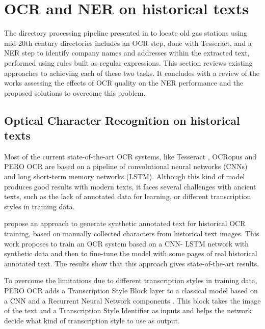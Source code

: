 \section{OCR and NER on historical texts}

The directory processing pipeline presented in \cite{bell2020automated} to locate old gas stations using mid-20th century directories includes an OCR step, done with Tesseract, and a NER step to identify company names and addresses within the extracted text, performed using rules built as regular expressions. This section reviews existing approaches to achieving each of these two tasks. It concludes with a review of the works assessing the effects of OCR quality on the NER performance and the proposed solutions to overcome this problem. 

\subsection{Optical Character Recognition on historical texts}

Most of the current state-of-the-art OCR systems, like Tesseract \cite{smith2007overview}, OCRopus \cite{breuel2008ocropus} and PERO OCR \cite{kohut2021ts} are based on a pipeline of convolutional neural networks (CNNs) and long short-term memory networks (LSTM). Although this kind of model produces good results with modern texts, it faces several challenges with ancient texts, such as the lack of annotated data for learning, or different transcription styles in training data.

\cite{martinek2019hybrid} propose an approach to generate synthetic annotated text for historical OCR training, based on manually collected characters from historical text images. This work proposes to train an OCR system based on a CNN-
LSTM network with synthetic data and then to fine-tune the model with some pages of real historical annotated text. The results show that this approach gives state-of-the-art results. 

To overcome the limitations due to different transcription styles in training data, PERO OCR adds a Transcription Style Block layer to a classical model based on a CNN and a Recurrent Neural Network components \cite{kohut2021ts}. This block takes the image of the text and a Transcription Style Identifier as inputs and helps the network decide what kind of transcription style to use as output.


